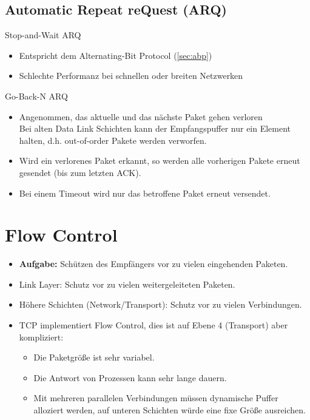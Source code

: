 \documentclass[a4paper, 11pt, accentcolor = tud3b]{tudreport}
\begin{document}
            \subsection{Automatic Repeat reQuest (ARQ)}
                \begin{description}[leftmargin = 2cm]
                	\item[ARQ Typ 1] Stop-and-Wait ARQ
	                	\begin{itemize}
	                		\item Entspricht dem Alternating-Bit Protocol (\ref{sec:abp})
	                		\item Schlechte Performanz bei schnellen oder breiten Netzwerken
	                	\end{itemize}
                	\item[ARQ Typ 2] Go-Back-N ARQ
	                	\begin{itemize}
	                		\item Angenommen, das aktuelle und das nächste Paket gehen verloren \\ Bei alten Data Link Schichten kann der Empfangspuffer nur ein Element halten, d.h. out-of-order Pakete werden verworfen.
	                		\item Wird ein verlorenes Paket erkannt, so werden alle vorherigen Pakete erneut gesendet (bis zum letzten ACK).
	                		\item Bei einem Timeout wird nur das betroffene Paket erneut versendet.
	                	\end{itemize}
                \end{description}

        \section{Flow Control}
            \begin{itemize}
            	\item \textbf{Aufgabe:} Schützen des Empfängers vor zu vielen eingehenden Paketen.
            	\item Link Layer: Schutz vor zu vielen weitergeleiteten Paketen.
            	\item Höhere Schichten (Network/Transport): Schutz vor zu vielen Verbindungen.
            	\item TCP implementiert Flow Control, dies ist auf Ebene 4 (Transport) aber kompliziert:
	            	\begin{itemize}
	            		\item Die Paketgröße ist sehr variabel.
	            		\item Die Antwort von Prozessen kann sehr lange dauern.
	            		\item Mit mehreren parallelen Verbindungen müssen dynamische Puffer alloziert werden, auf unteren Schichten würde eine fixe Größe ausreichen.
	            	\end{itemize}
            \end{itemize}
\end{document}
